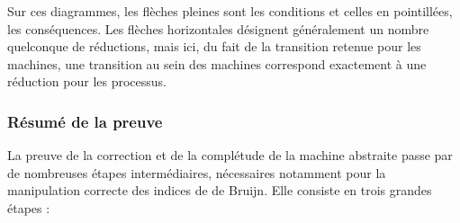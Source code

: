 \documentclass[11pt]{article}
\begin{document}
Sur ces diagrammes, les flèches pleines sont les conditions et celles en pointillées, les conséquences.
Les flèches horizontales désignent généralement un nombre quelconque de réductions, mais ici, du fait de la transition retenue pour les machines, une transition au sein des machines correspond exactement à une réduction pour les processus.

\subsubsection{Résumé de la preuve}
\label{sec-3-2-3}

La preuve de la correction et de la complétude de la machine abstraite passe par de nombreuses étapes intermédiaires, nécessaires notamment pour la manipulation correcte des indices de de Bruijn.
Elle consiste en trois grandes étapes :
\end{document}
